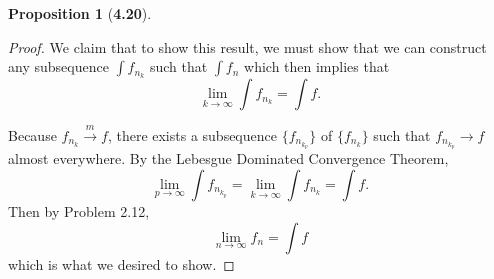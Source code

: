 \documentclass[12pt]{article}
\newcommand{\toM}{\overset{m}{\to}}
\theoremstyle{definition}
\newtheorem*{prop}{Proposition}
\begin{document}
\begin{prop}[\textbf{4.20}]
\begin{enumerate}[label = (\arabic{*})]
            \begin{proof}
                We claim that to show this result, we must show that we can construct any subsequence \( \displaystyle \int f_{n_{k}} \) such that \( \displaystyle \int f_n \) which then implies that
                    \[
                        \lim_{k \to \infty} \int f_{n_{k}} = \int f.  
                    \]
                
                Because \( f_{n_{k}} \toM f\), there exists a subsequence \( \{f_{n_{k_{p}}}\} \) of \( \{f_{n_{k}}\} \) such that 
                \( f_{n_{k_{p}}} \to f \) almost everywhere. By the Lebesgue Dominated Convergence Theorem,
                    \[
                        \lim_{p \to \infty} \int f_{n_{k_{p}}} = \lim_{k \to \infty} \int  f_{n_{k}} =  \int f.
                    \]
                Then by Problem 2.12,
                    \[
                        \lim_{n \to \infty} f_n = \int f  
                    \]
                which is what we desired to show.
            \end{proof}
    \end{enumerate}
\end{prop}
\end{document}
